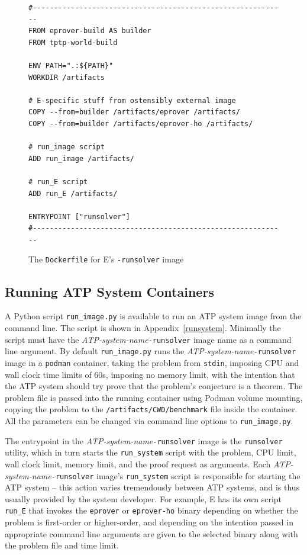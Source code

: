 \documentclass{easychair}
\begin{document}
\begin{figure}[htb]
{\small
\begin{verbatim}
#------------------------------------------------------------
FROM eprover-build AS builder
FROM tptp-world-build

ENV PATH=".:${PATH}"
WORKDIR /artifacts

# E-specific stuff from ostensibly external image
COPY --from=builder /artifacts/eprover /artifacts/
COPY --from=builder /artifacts/eprover-ho /artifacts/

# run_image script 
ADD run_image /artifacts/

# run_E script 
ADD run_E /artifacts/

ENTRYPOINT ["runsolver"]
#------------------------------------------------------------
\end{verbatim}
}
\caption{The {\tt Dockerfile} for E's {\tt -runsolver} image}
\label{E---runsolver}
\end{figure}

\subsection{Running ATP System Containers}
\label{Running}

A Python script {\tt run\_image.py} is available to run an ATP system image from the command line.
The script is shown in Appendix~\ref{runsystem}.
Minimally the script must have the {\em ATP-system-name}{\tt -runsolver} image name as a command 
line argument.
By default {\tt run\_image.py} runs the {\em ATP-system-name}{\tt -runsolver} image in a
{\tt podman} container, taking the problem from {\tt stdin}, imposing CPU and wall clock time 
limits of 60s, imposing no memory limit, with the intention that the ATP system should try prove 
that the problem's conjecture is a theorem.
The problem file is passed into the running container using Podman volume mounting, copying the
problem to the {\tt /artifacts/CWD/benchmark} file inside the container.
All the parameters can be changed via command line options to {\tt run\_image.py}.

The entrypoint in the {\em ATP-system-name}{\tt -runsolver} image is the {\tt runsolver} utility, 
which in turn starts the {\tt run\_system} script with the problem, CPU limit, wall clock limit, 
memory limit, and the proof request as arguments.
Each {\em ATP-system-name}{\tt -runsolver} image's {\tt run\_system} script is responsible for 
starting the ATP system -- this action varies tremendously between ATP systems, and is thus 
usually provided by the system developer.
For example, E has its own script {\tt run\_E} that invokes the {\tt eprover} or {\tt eprover-ho}
binary depending on whether the problem is first-order or higher-order, and depending on the
intention passed in appropriate command line arguments are given to the selected binary along
with the problem file and time limit.
\end{document}

